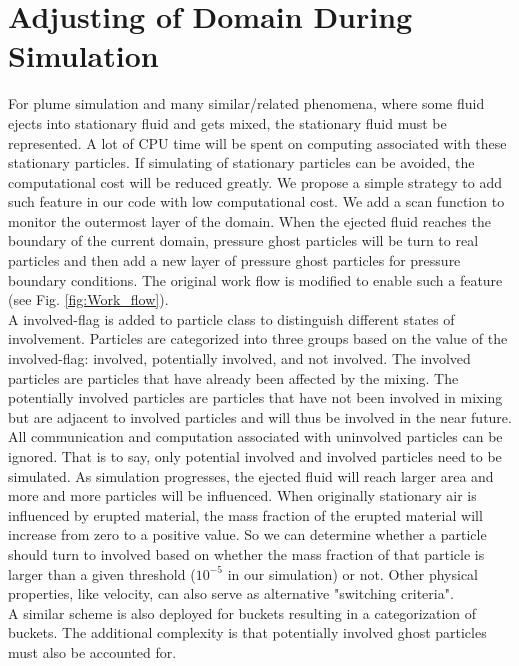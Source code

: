\documentclass[procedia]{easychair}
\begin{document}
\section{Adjusting of Domain During Simulation} 
For plume simulation and many similar/related phenomena, where some fluid ejects into stationary fluid and gets mixed, the stationary fluid must be represented.
A lot of CPU time will be spent on computing associated with these stationary particles. If simulating of stationary particles can be avoided, the computational cost will be reduced greatly.
We propose a simple strategy to add such feature in our code with low computational cost. We add a scan function to monitor the outermost layer of the domain. When the ejected fluid reaches the boundary of the current domain, pressure ghost particles will be turn to real particles and then add a new layer of pressure ghost particles for pressure boundary conditions. The original work flow is modified to enable such a feature (see Fig. \ref{fig:Work_flow}).\\
A involved-flag is added to particle class to distinguish different states of involvement. Particles are categorized into three groups based on the value of the involved-flag: involved, potentially involved, and not involved. The involved particles are particles that have already been affected by the mixing. The potentially involved particles are particles that have not been involved in mixing but are adjacent to involved particles and will thus be involved in the near future. 
All communication and computation associated with uninvolved particles can be ignored. That is to say, only potential involved and involved particles need to be simulated.
As simulation progresses, the ejected fluid will reach larger area and more and more particles will be influenced. When originally stationary air is influenced by erupted material, the mass fraction of the erupted material will increase from zero to a positive value. So we can determine whether a particle should turn to involved based on whether the mass fraction of that particle is larger than a given threshold ($10^{-5} $ in our simulation) or not. Other physical properties, like velocity, can also serve as alternative "switching criteria".\\
A similar scheme is also deployed for buckets resulting in a categorization of buckets. The additional complexity is that potentially involved ghost particles must also be accounted for.
\end{document}
